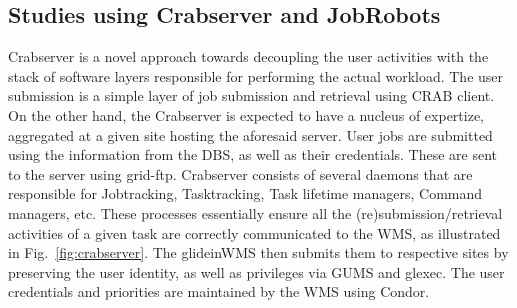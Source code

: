 \documentclass[a4paper]{jpconf}
\begin{document}
\subsection{Studies using Crabserver and JobRobots}
Crabserver is a novel approach towards decoupling the user activities with the stack of software
layers responsible for performing the actual workload. The user submission is a simple layer 
of job submission and retrieval using CRAB client. On the other hand, the Crabserver is expected 
to have a nucleus of expertize, aggregated at a given site hosting the aforesaid server. User jobs
are submitted using the information from the DBS, as well as their credentials.
These are sent to the server using grid-ftp. Crabserver consists of several daemons that are responsible 
for Jobtracking, Tasktracking, Task lifetime managers, Command managers, etc. These processes
essentially ensure all the (re)submission/retrieval activities of a given task are correctly communicated
to the WMS, as illustrated in Fig.~\ref{fig:crabserver}. The glideinWMS then submits them to respective sites 
by preserving the user identity, as well as privileges via GUMS and glexec. The user credentials
and priorities are maintained by the WMS using Condor.
\end{document}
